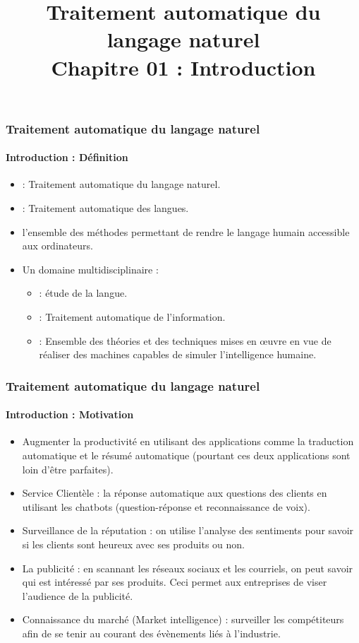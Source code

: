 \documentclass[xcolor=table]{beamer}
\title[TALN : 01- Introduction]%
{Traitement automatique du langage naturel\\Chapitre 01 : Introduction}
\begin{document}
	
\begin{frame}
\frametitle{Traitement automatique du langage naturel}
\framesubtitle{Introduction : Définition}

\begin{itemize}
	\item {} : Traitement automatique du langage naturel.
	\item {} : Traitement automatique des langues.
	\item l'ensemble des méthodes permettant de rendre le langage humain accessible aux ordinateurs.
\end{itemize}
\begin{minipage}{0.78\textwidth}
\begin{itemize}
	\item Un domaine multidisciplinaire :
	\begin{itemize}
		\item {} : étude de la langue.
		\item {} : Traitement automatique de l'information.
		\item {} : Ensemble des théories et des techniques mises en œuvre en vue de réaliser des machines capables de simuler l'intelligence humaine.
	\end{itemize}
\end{itemize}
\end{minipage}
\begin{minipage}{0.20\textwidth}
\end{minipage}
\end{frame}

\begin{frame}
\frametitle{Traitement automatique du langage naturel}
\framesubtitle{Introduction : Motivation}

\begin{itemize}
	\item Augmenter la productivité en utilisant des applications comme la traduction automatique et le résumé automatique (pourtant ces deux applications sont loin d'être parfaites).
	
	\item Service Clientèle : la réponse automatique aux questions des clients en utilisant les chatbots (question-réponse et reconnaissance de voix). 
	
	\item Surveillance de la réputation : on utilise l'analyse des sentiments pour savoir si les clients sont heureux avec ses produits ou non. 
	
	\item La publicité : en scannant les réseaux sociaux et les courriels, on peut savoir qui est intéressé par ses produits. Ceci permet aux entreprises de viser l'audience de la publicité. 
	
	\item Connaissance du marché (Market intelligence) : surveiller les compétiteurs afin de se tenir au courant des évènements liés à l'industrie.
\end{itemize}

\end{frame}
\end{document}

